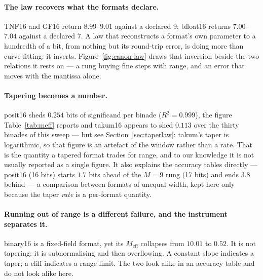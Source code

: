 \documentclass[11pt]{article}
\theoremstyle{definition}
\begin{document}
\paragraph{The law recovers what the formats declare.} TNF16 and GF16 return
$8.99$--$9.01$ against a declared 9; bfloat16 returns $7.00$--$7.04$ against a
declared 7. A law that reconstructs a format's own parameter to a hundredth of a
bit, from nothing but its round-trip error, is doing more than curve-fitting: it
inverts. Figure~\ref{fig:canon-law} draws that inversion beside the two relations
it rests on --- a rung buying fine steps with range, and an error that moves with
the mantissa alone.

\paragraph{Tapering becomes a number.} posit16 sheds $0.254$ bits of significand
per binade ($R^2 = 0.999$), the figure Table~\ref{tab:meff} reports and takum16 appears to shed $0.113$ over the thirty
binades of this sweep --- but see Section~\ref{sec:taperlaw}: takum's taper is
logarithmic, so that figure is an artefact of the window rather than a rate. That is the
quantity a tapered format trades for range, and to our knowledge it is not usually
reported as a single figure. It also explains the accuracy tables directly ---
posit16 (16 bits) starts $1.7$ bits ahead of the $M{=}9$ rung (17 bits) and
ends $3.8$ behind --- a comparison between formats of unequal width, kept here
only because the taper \emph{rate} is a per-format quantity.

\paragraph{Running out of range is a different failure, and the instrument
separates it.} binary16 is a fixed-field format, yet its $M_{\mathrm{eff}}$
collapses from $10.01$ to $0.52$. It is not tapering: it is subnormalising and
then overflowing. A constant slope indicates a taper; a cliff indicates a range
limit. The two look alike in an accuracy table and do not look alike here.
\end{document}
